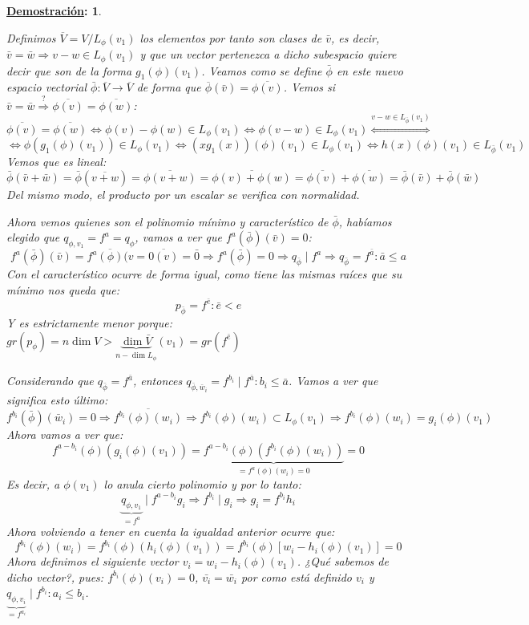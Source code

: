 \documentclass[10pt,a4paper,openright]{book}
\theoremstyle{break}
\newtheorem*{demo}{\underline{Demostración}:}
\begin{document}
\begin{demo}
\begin{itemize}
Definimos $\overline{V}=V/L_\phi(v_1)$ los elementos por tanto son clases de $\bar{v}$, es decir, $\bar{v}=\bar{w}\Rightarrow v-w\in L_\phi(v_1)$ y que un vector pertenezca a dicho subespacio quiere decir que son de la forma $g_1(\phi)(v_1)$. Veamos como se define $\bar{\phi}$ en este nuevo espacio vectorial $\bar{\phi}: \overline{V}\rightarrow \overline{V}$ de forma que $\overline{\phi}(\bar{v})=\overline{\phi(v)}$. Vemos si $\bar{v}=\bar{w}\stackrel{?}{\Rightarrow} \overline{\phi(v)}=\overline{\phi(w)}$:
$$\overline{\phi(v)}=\overline{\phi(w)}\Leftrightarrow \phi(v)-\phi(w)\in  L_\phi(v_1)\Leftrightarrow \phi(v-w)\in L_\phi(v_1)\stackrel{v-w\in L_{\bar{\phi}}(v_1)}{\Leftrightarrow}$$
$$\Leftrightarrow \phi(g_1(\phi)(v_1))\in L_\phi(v_1)\Leftrightarrow (xg_1(x))(\phi)(v_1)\in L_\phi(v_1)\Leftrightarrow h(x)(\phi)(v_1)\in L_{\bar{\phi}}(v_1)$$
Vemos que es lineal:
$$\bar{\phi}(\bar{v}+\bar{w})=\bar{\phi}(\overline{v+w})=\overline{\phi(v+w)}=\overline{\phi(v)+\phi(w)}=\overline{\phi(v)}+\overline{\phi(w)}=\bar{\phi}(\bar{v})+\bar{\phi}(\bar{w})$$
Del mismo modo, el producto por un escalar se verifica con normalidad.

Ahora vemos quienes son el polinomio mínimo y característico de $\bar{\phi}$, habíamos elegido que $q_{\phi, v_1}=f^a=q_\phi$, vamos a ver que $f^a(\bar{\phi})(\bar{v})=0$:
$$f^a(\bar{\phi})(\bar{v})=\overline{f^a(\phi)(v}=\overline{0(v)}=\bar{0}\Rightarrow f^a(\bar{\phi})=0\Rightarrow q_{\bar{\phi}}\mid f^a\Rightarrow q_{\bar{\phi}}=f^{\bar{a}}: \bar{a} \leq a$$
Con el característico ocurre de forma igual, como tiene las mismas raíces que su mínimo nos queda que:
$$p_{\bar{\phi}}=f^{\bar{e}}: \bar{e}< e$$
Y es estrictamente menor porque: $gr(p_\phi)=n\dim V> \underbrace{\dim \bar{V}}_{n-\dim L_\phi}(v_1)=gr(f^{\bar{e}})$

Considerando que $q_{\bar{\phi}}=f^{\bar{a}}$, entonces $q_{\bar{\phi}, \bar{w}_i}=f^{b_i}\mid f^{\bar{a}}: b_i\leq \bar{a}$. Vamos a ver que significa esto último:
$$f^{b_i}(\bar{\phi})(\bar{w}_i)=0\Rightarrow \overline{f^{b_i}(\phi)(w_i)}\Rightarrow f^{b_i}(\phi)(w_i)\subset L_\phi(v_1)\Rightarrow f^{b_i}(\phi)(w_i)=g_i(\phi)(v_1)$$
Ahora vamos a ver que:
$$f^{a-b_i}(\phi)\left(g_i(\phi)(v_1)\right)=\underbrace{f^{a-b_i}(\phi)\left(f^{b_i}(\phi)(w_i)\right)}_{=f^a(\phi)(w_i)=0}=0$$
Es decir, a $\phi(v_1)$ lo anula cierto polinomio y por lo tanto:
$$\underbrace{q_{\phi, v_1}}_{=f^a}\mid f^{a-b_i}g_i\Rightarrow f^{b_i}\mid g_i\Rightarrow g_i=f^{b_i}h_i$$
Ahora volviendo a tener en cuenta la igualdad anterior ocurre que:
$$f^{b_i}(\phi)(w_i)=f^{b_i}(\phi)\left(h_i(\phi)(v_1)\right)=f^{b_i}(\phi)\left[w_i-h_i(\phi)(v_1)\right]=0$$
Ahora definimos el siguiente vector $v_i=w_i-h_i(\phi)(v_1)$. ¿Qué sabemos de dicho vector?, pues: $f^{b_i}(\phi)(v_i)=0$, $\bar{v_i}=\bar{w_i}$ por como está definido $v_i$ y $\underbrace{q_{\phi, v_i}}_{=f^{a_i}}\mid f^{b_i}: a_i\leq b_i$.


\end{itemize}
\end{demo}
\end{document}
